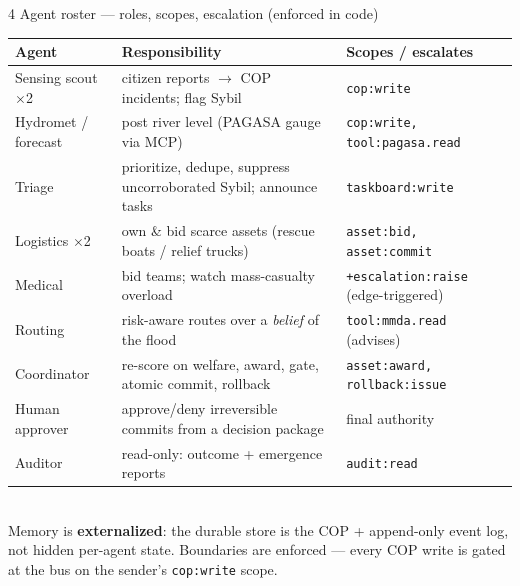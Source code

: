 \documentclass[aspectratio=169,11pt]{beamer}
\begin{document}
\begin{frame}{4 \;\; Agent roster --- roles, scopes, escalation (enforced in code)}
  \scriptsize
  \begin{tabular}{@{}p{2.3cm}p{6.4cm}p{4.2cm}@{}}
    \toprule
    \textbf{Agent} & \textbf{Responsibility} & \textbf{Scopes / escalates} \\
    \midrule
    Sensing scout $\times$2 & citizen reports $\rightarrow$ COP incidents; flag Sybil & \texttt{cop:write} \\
    Hydromet / forecast & post river level (PAGASA gauge via MCP) & \texttt{cop:write, tool:pagasa.read} \\
    Triage & prioritize, dedupe, suppress uncorroborated Sybil; announce tasks & \texttt{taskboard:write} \\
    Logistics $\times$2 & own \& bid scarce assets (rescue boats / relief trucks) & \texttt{asset:bid, asset:commit} \\
    Medical & bid teams; watch mass-casualty overload & \texttt{+escalation:raise} (edge-triggered) \\
    Routing & risk-aware routes over a \emph{belief} of the flood & \texttt{tool:mmda.read} (advises) \\
    Coordinator & re-score on welfare, award, gate, atomic commit, rollback & \texttt{asset:award, rollback:issue} \\
    Human approver & approve/deny irreversible commits from a decision package & final authority \\
    Auditor & read-only: outcome + emergence reports & \texttt{audit:read} \\
    \bottomrule
  \end{tabular}
  \vspace{0.4em}\\
  \footnotesize Memory is \textbf{externalized}: the durable store is the COP + append-only event log,
  not hidden per-agent state. Boundaries are enforced --- every COP write is gated at the bus on the
  sender's \texttt{cop:write} scope.
\end{frame}
\end{document}
